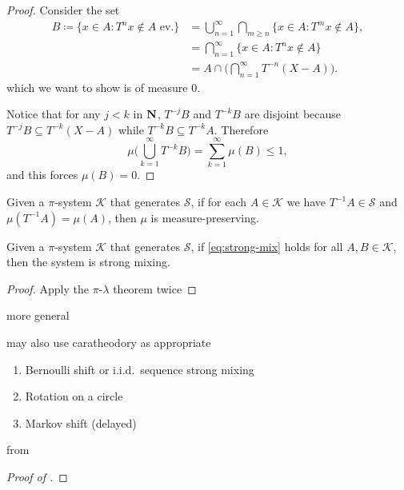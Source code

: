 \begin{proof}
    Consider the set \begin{align*} B \coloneqq \{x\in A : T^n x \notin A \text{ ev.}\} & = \bigcup_{n=1}^\infty \bigcap_{m \geq n} \{x \in A : T^m x \notin A\}, \\
    & = \bigcap_{n=1}^\infty \{x \in A: T^n x \notin A\} \\
    & = A \cap \biggl(\bigcap_{n=1}^\infty T^{-n} (X - A)\biggr).\end{align*} which we want to show is of measure $0$.

    Notice that for any $j < k$ in $\mathbf{N}$, $T^{-j}B$ and $T^{-k}B$ are disjoint because $T^{-j} B \subseteq T^{-k} (X - A)$ while $T^{-k} B \subseteq T^{-k} A$. Therefore \[
        \mu\biggl(\bigcup_{k=1}^\infty T^{-k} B\biggr) = \sum_{k=1}^\infty \mu(B) \leq 1,
    \] and this forces $\mu (B) = 0$.
\end{proof}

\begin{lem}
    Given a $\pi$-system $\mathcal K$ that generates $\mathcal S$, if for each $A \in \mathcal K$ we have $T^{-1} A \in \mathcal S$ and $\mu(T^{-1}A) = \mu(A)$, then $\mu$ is measure-preserving.
\end{lem}

\begin{lem}
    Given a $\pi$-system $\mathcal K$ that generates $\mathcal S$, if \eqref{eq:strong-mix} holds for all $A,B \in \mathcal K$, then the system is strong mixing.
\end{lem}
\begin{proof}
    Apply the $\pi$-$\lambda$ theorem twice
\end{proof}

more general \cite[Lemma~24.2]{Billingsley_1995}

may also use caratheodory as appropriate

\begin{exa}
    \begin{enumerate}
        \item Bernoulli shift or i.i.d.\ sequence strong mixing 
        \item Rotation on a circle
        \item Markov shift (delayed)
    \end{enumerate}
\end{exa}

from \cite[Theorem~36.5]{Billingsley_1995}
\begin{proof}[Proof of ]
    
\end{proof}


